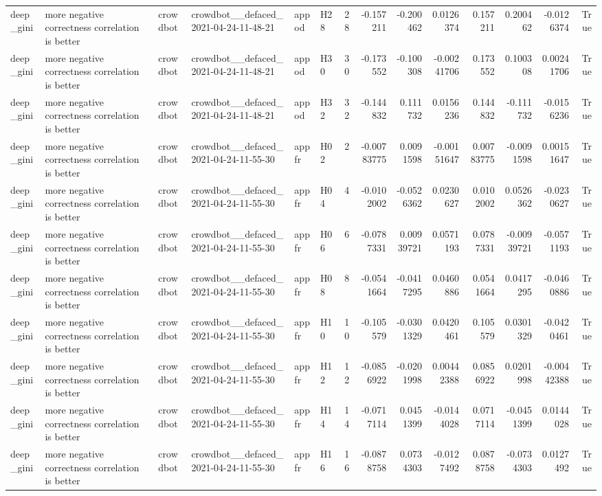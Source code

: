 \begin{longtable}{llllllrrrrrrrr}
deep\_gini & more negative correctness correlation is better & crowdbot & crowdbot\_\_defaced\_2021-04-24-11-48-21 & appod & H28 & 28 & -0.157211 & -0.200462 & 0.0126374 & 0.157211 & 0.200462 & -0.0126374 & True \\
deep\_gini & more negative correctness correlation is better & crowdbot & crowdbot\_\_defaced\_2021-04-24-11-48-21 & appod & H30 & 30 & -0.173552 & -0.100308 & -0.00241706 & 0.173552 & 0.100308 & 0.00241706 & True \\
deep\_gini & more negative correctness correlation is better & crowdbot & crowdbot\_\_defaced\_2021-04-24-11-48-21 & appod & H32 & 32 & -0.144832 & 0.111732 & 0.0156236 & 0.144832 & -0.111732 & -0.0156236 & True \\
deep\_gini & more negative correctness correlation is better & crowdbot & crowdbot\_\_defaced\_2021-04-24-11-55-30 & appfr & H02 & 2 & -0.00783775 & 0.0091598 & -0.00151647 & 0.00783775 & -0.0091598 & 0.00151647 & True \\
deep\_gini & more negative correctness correlation is better & crowdbot & crowdbot\_\_defaced\_2021-04-24-11-55-30 & appfr & H04 & 4 & -0.0102002 & -0.0526362 & 0.0230627 & 0.0102002 & 0.0526362 & -0.0230627 & True \\
deep\_gini & more negative correctness correlation is better & crowdbot & crowdbot\_\_defaced\_2021-04-24-11-55-30 & appfr & H06 & 6 & -0.0787331 & 0.00939721 & 0.0571193 & 0.0787331 & -0.00939721 & -0.0571193 & True \\
deep\_gini & more negative correctness correlation is better & crowdbot & crowdbot\_\_defaced\_2021-04-24-11-55-30 & appfr & H08 & 8 & -0.0541664 & -0.0417295 & 0.0460886 & 0.0541664 & 0.0417295 & -0.0460886 & True \\
deep\_gini & more negative correctness correlation is better & crowdbot & crowdbot\_\_defaced\_2021-04-24-11-55-30 & appfr & H10 & 10 & -0.105579 & -0.0301329 & 0.0420461 & 0.105579 & 0.0301329 & -0.0420461 & True \\
deep\_gini & more negative correctness correlation is better & crowdbot & crowdbot\_\_defaced\_2021-04-24-11-55-30 & appfr & H12 & 12 & -0.0856922 & -0.0201998 & 0.00442388 & 0.0856922 & 0.0201998 & -0.00442388 & True \\
deep\_gini & more negative correctness correlation is better & crowdbot & crowdbot\_\_defaced\_2021-04-24-11-55-30 & appfr & H14 & 14 & -0.0717114 & 0.0451399 & -0.0144028 & 0.0717114 & -0.0451399 & 0.0144028 & True \\
deep\_gini & more negative correctness correlation is better & crowdbot & crowdbot\_\_defaced\_2021-04-24-11-55-30 & appfr & H16 & 16 & -0.0878758 & 0.0734303 & -0.0127492 & 0.0878758 & -0.0734303 & 0.0127492 & True \\

\end{longtable}
